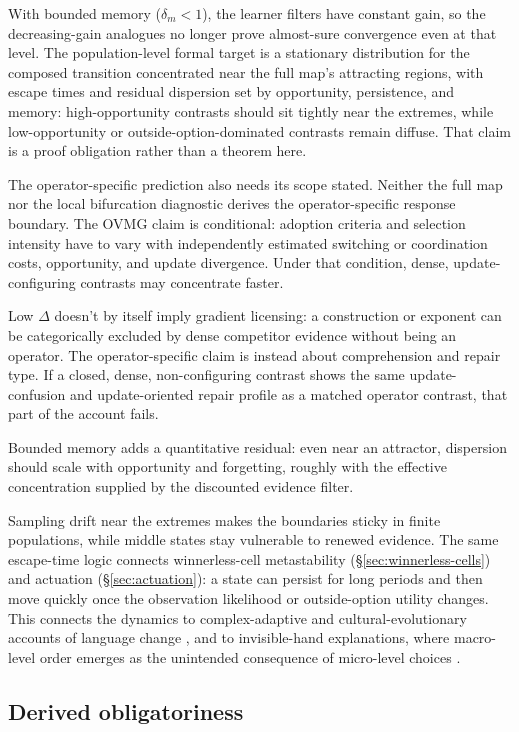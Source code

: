 With bounded memory ($\delta_m<1$), the learner filters have constant gain, so
the decreasing-gain analogues no longer prove almost-sure convergence even at
that level. The population-level formal target is a stationary distribution for
the composed transition concentrated near the full map's attracting regions,
with escape times and residual dispersion set by opportunity, persistence, and
memory: high-opportunity contrasts should sit tightly near the extremes, while
low-opportunity or outside-option-dominated contrasts remain diffuse. That claim is a proof
obligation rather than a theorem here.

The operator-specific prediction also needs its scope stated. Neither the full
map nor the local bifurcation diagnostic derives the operator-specific response
boundary. The OVMG claim is
conditional: adoption criteria and selection intensity have to vary with
independently estimated switching or coordination costs, opportunity, and
update divergence. Under that condition, dense, update-configuring contrasts
may concentrate faster.

Low $\Delta$ doesn't by itself imply gradient
licensing: a construction or exponent can be categorically excluded by dense
competitor evidence without being an operator. The operator-specific claim is
instead about comprehension and repair type. If a closed, dense,
non-configuring contrast shows the same update-confusion and update-oriented
repair profile as a matched operator contrast, that part of the account fails.

Bounded memory adds a quantitative residual: even near an attractor, dispersion
should scale with opportunity and forgetting, roughly with the effective
concentration supplied by the discounted evidence filter.

Sampling drift near the extremes makes the boundaries sticky in finite
populations, while middle states stay vulnerable to renewed evidence. The same
escape-time logic connects winnerless-cell metastability (\S\ref{sec:winnerless-cells})
and actuation (\S\ref{sec:actuation}): a state can persist for long periods and
then move quickly once the observation likelihood or outside-option utility changes.
This connects the dynamics to complex-adaptive and cultural-evolutionary
accounts of language change \autocite{beckner2009,kirby2014,BlytheCroft2012},
and to invisible-hand explanations, where macro-level order emerges as the
unintended consequence of micro-level choices \autocite{keller1994}.

\subsection{Derived obligatoriness}
\label{sec:derived-obligatoriness}


